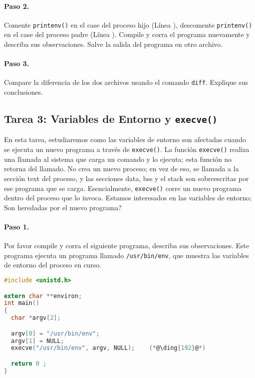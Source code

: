 \paragraph{Paso 2.} Comente {\tt printenv()} en el case del proceso hijo (Línea ), descomente {\tt printenv()} en el case del proceso padre (Línea ). Compile y corra el programa nuevamente y describa sus observaciones. Salve la salida del programa en otro archivo.


\paragraph{Paso 3.} Compare la diferencia de los dos archivos usando el comando 
 {\tt diff}. Explique sus conclusiones.



\subsection{Tarea 3: Variables de Entorno y {\tt execve()}}

En esta tarea, estudiaremos como las variables de entorno son afectadas cuando se ejecuta un nuevo programa a través de {\tt execve()}. La función {\tt execve()} realiza una llamada al sistema que carga un comando y lo ejecuta; esta función no retorna del llamado. No crea un nuevo proceso; en vez de eso, se llamada a la sección text del proceso, y las secciones data, bss y el stack son sobreescritas por ese programa que se carga. Esencialmente, {\tt execve()} corre un nuevo programa dentro del proceso que lo invoca. Estamos interesados en las variables de entorno; Son heredadas por el nuevo programa?


\paragraph{Paso 1.} Por favor compile y corra el siguiente programa, describa sus observaciones. Este programa ejecuta un programa llamado \texttt{/usr/bin/env}, que muestra las variables de entorno del proceso en curso.

\begin{lstlisting}[language=C, caption=\texttt{myenv.c}]
#include <unistd.h>

extern char **environ;
int main()
{
  char *argv[2];

  argv[0] = "/usr/bin/env";
  argv[1] = NULL;
  execve("/usr/bin/env", argv, NULL);    (*@\ding{192}@*)

  return 0 ;
}
\end{lstlisting}


